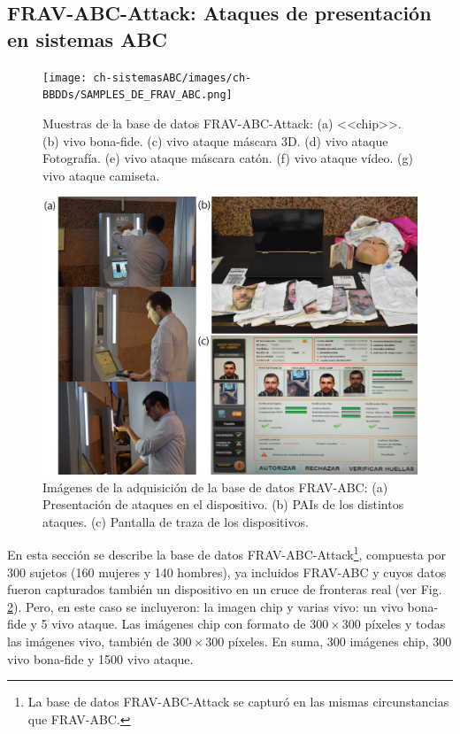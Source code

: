 \subsection{FRAV-ABC-Attack: Ataques de presentación en sistemas ABC}\label{subsec:FRAV-ABC-ATTACK}

\begin{figure}[ht]
    \centering
    \texttt{[image: ch-sistemasABC/images/ch-BBDDs/SAMPLES\_DE\_FRAV\_ABC.png]}
    \caption{Muestras de la base de datos \Gls{FRAV-ABC-Attack}: (a) <<chip>>. (b) \gls{vivo bona-fide}. (c) \gls{vivo ataque} máscara $3$D. (d) \gls{vivo ataque} Fotografía. (e) \gls{vivo ataque} máscara catón. (f) \gls{vivo ataque} vídeo. (g) \gls{vivo ataque} camiseta.}
    \label{fig:SAMPLES-FRAV-ABC-ATTACK}
\end{figure}

\begin{figure}[ht]
    \centering
    \includegraphics[width=1\linewidth]{ch-sistemasABC/images/ch-BBDDs/CAPTURA_FRAV_ABC.png}
    \caption{Imágenes de la adquisición de la base de datos \Gls{FRAV-ABC}: (a) Presentación de ataques en el dispositivo. (b) \Glspl{PAI} de los distintos ataques. (c) Pantalla de traza de los dispositivos.}
    \label{fig:AdquisicionFRAVABC}
\end{figure}

En esta sección se describe la base de datos \gls{FRAV-ABC-Attack}\footnote{La base de datos \Gls{FRAV-ABC-Attack} se capturó en las mismas circunstancias que \Gls{FRAV-ABC}.}, compuesta por 300 sujetos (160 mujeres y 140 hombres), ya incluidos \gls{FRAV-ABC} y cuyos datos fueron capturados también un dispositivo  en un cruce de fronteras real (ver Fig. \ref{fig:AdquisicionFRAVABC}). Pero, en este caso se incluyeron: la imagen \gls{chip} y varias \gls{vivo}: un  \gls{vivo bona-fide} y 5 \gls{vivo ataque}. Las imágenes \gls{chip} con formato  de $300\times300$ píxeles y todas las imágenes \gls{vivo}, también  de $300\times300$ píxeles. En suma, 300 imágenes \gls{chip}, 300 \gls{vivo bona-fide} y 1500 \gls{vivo ataque}.

